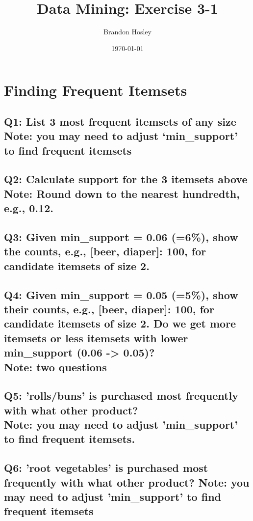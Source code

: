 \documentclass[]{article}
\title{Data Mining: Exercise 3-1}
\author{Brandon Hosley}
\date{\today}
\begin{document}
\maketitle

\section*{Finding Frequent Itemsets}

\subsection*{Q1: List 3 most frequent itemsets of any size \\ Note: you may need to adjust ‘min\_support’ to find frequent itemsets}

\subsection*{Q2: Calculate support for the 3 itemsets above \\ Note: Round down to the nearest hundredth, e.g., 0.12.}

\subsection*{Q3: Given min\_support = 0.06 (=6\%), show the counts, e.g., [beer, diaper]: 100, for candidate itemsets of size 2. }

\subsection*{Q4: Given min\_support = 0.05 (=5\%), show their counts, e.g., [beer, diaper]: 100, for candidate itemsets of size 2. Do we get more itemsets or less itemsets with lower min\_support (0.06 -> 0.05)? \\ Note: two questions}

\subsection*{Q5: 'rolls/buns' is purchased most frequently with what other product? \\	Note: you may need to adjust 'min\_support' to find frequent itemsets.}

\subsection*{Q6: 'root vegetables' is purchased most frequently with what other product? Note: you may need to adjust 'min\_support' to find frequent itemsets}
\end{document}
